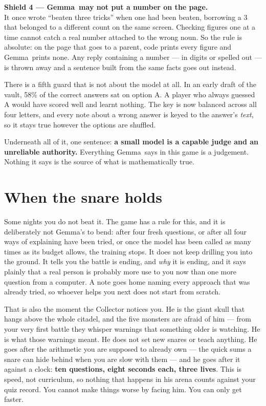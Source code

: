 \documentclass[11pt]{article}
\newcommand{\themodel}{Gemma}
\begin{document}
\begin{shieldbox}
\textbf{Shield 4 --- \themodel\ may not put a number on the page.}\\
It once wrote ``beaten three tricks'' when one had been beaten, borrowing a 3
that belonged to a different count on the same screen. Checking figures one at
a time cannot catch a real number attached to the wrong noun. So the rule is
absolute: on the page that goes to a parent, code prints every figure and
\themodel\ prints none. Any reply containing a number --- in digits or spelled
out --- is thrown away and a sentence built from the same facts goes out
instead.
\end{shieldbox}

\vspace{0.3em}
There is a fifth guard that is not about the model at all. In an early draft of
the vault, 58\% of the correct answers sat on option A. A player who always
guessed A would have scored well and learnt nothing. The key is now balanced
across all four letters, and every note about a wrong answer is keyed to the
answer's \emph{text}, so it stays true however the options are shuffled.

\begin{quietbox}
Underneath all of it, one sentence: \textbf{a small model is a capable judge and
an unreliable authority.} Everything \themodel\ says in this game is a
judgement. Nothing it says is the source of what is mathematically true.
\end{quietbox}

\section{When the snare holds}

Some nights you do not beat it. The game has a rule for this, and it is
deliberately not \themodel's to bend: after four fresh questions, or after all
four ways of explaining have been tried, or once the model has been called as
many times as its budget allows, the training stops. It does not keep drilling
you into the ground. It tells you the battle is ending, and \emph{why} it is
ending, and it says plainly that a real person is probably more use to you now
than one more question from a computer. A note goes home naming every approach
that was already tried, so whoever helps you next does not start from scratch.

That is also the moment the Collector notices you. He is the giant skull that
hangs above the whole citadel, and the five monsters are afraid of him --- from
your very first battle they whisper warnings that something older is watching.
He is what those warnings meant. He does not set new snares or teach anything.
He goes after the arithmetic you are supposed to already own --- the quick
sums a snare can hide behind when you are slow with them --- and he goes after
it against a clock: \textbf{ten questions, eight seconds each, three lives}.
This is speed, not curriculum, so nothing that happens in his arena counts
against your quiz record. You cannot make things worse by facing him. You can
only get faster.
\end{document}
